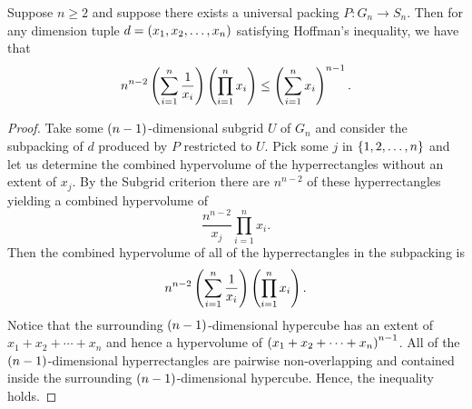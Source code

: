 \begin{corollary}
Suppose $n \geq 2$ and suppose there exists a universal packing $P\colon G_n \to S_n$. Then for any dimension tuple $d = \left( x_1, x_2, \dotsc, x_n \right)$ satisfying Hoffman's inequality, we have that
\[
n^{n-2}\left( \sum_{i=1}^{n}{\frac{1}{x_i}} \right) \left( \prod_{i=1}^{n}{x_i}  \right)
\leq \left( \sum_{i=1}^{n}{x_i} \right)^{n-1}.
\]
\end{corollary}

\begin{proof}
Take some $\left( n - 1 \right)$-dimensional subgrid $U$ of $G_n$ and consider the subpacking of $d$ produced by $P$ restricted to $U$. Pick some $j$ in $\left\{ 1, 2, \dotsc, n \right\}$ and let us determine the combined hypervolume of the hyperrectangles without an extent of $x_j$. By the Subgrid criterion  there are $n^{n - 2}$ of these hyperrectangles yielding a combined hypervolume of
\[
\frac{n^{n - 2}}{x_j}\prod_{i = 1}^{n}{x_i}.
\]
Then the combined hypervolume of all of the hyperrectangles in the subpacking is
\[
n^{n-2}\left( \sum_{i=1}^{n}{\frac{1}{x_i}} \right) \left( \prod_{i=1}^{n}{x_i} \right).
\]
Notice that the surrounding $\left( n - 1 \right)$-dimensional hypercube has an extent of $x_1 + x_2 + \dotsb + x_n$ and hence a hypervolume of $\left( x_1 + x_2 + \dotsb + x_n \right)^{n - 1}$. All of the $\left( n - 1 \right)$-dimensional hyperrectangles are pairwise non-overlapping and contained inside the surrounding $\left( n - 1 \right)$-dimensional hypercube. Hence, the inequality holds.
\end{proof}

